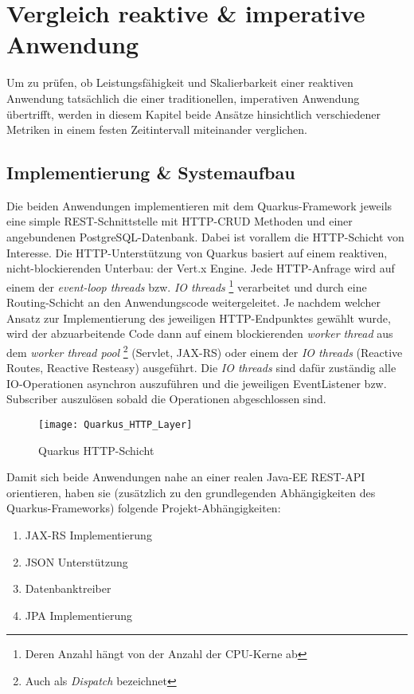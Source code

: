 \section {Vergleich reaktive \& imperative Anwendung}
\label{section:vergleich_reaktiv_imperativ}
Um zu prüfen, ob Leistungsfähigkeit und Skalierbarkeit einer reaktiven Anwendung tatsächlich die einer traditionellen, imperativen Anwendung
übertrifft, werden in diesem Kapitel beide Ansätze hinsichtlich verschiedener Metriken in einem festen Zeitintervall miteinander verglichen.

\subsection{Implementierung \& Systemaufbau}
\label{section:implementierung}
Die beiden Anwendungen implementieren mit dem Quarkus-Framework jeweils eine simple REST-Schnittstelle mit HTTP-CRUD Methoden
und einer angebundenen PostgreSQL-Datenbank.
Dabei ist vorallem die HTTP-Schicht von Interesse. Die HTTP-Unterstützung von Quarkus basiert auf einem reaktiven, nicht-blockierenden
Unterbau: der Vert.x Engine.
Jede HTTP-Anfrage wird auf einem der \textit{event-loop threads} bzw. \textit{IO threads}
\footnote{Deren Anzahl hängt von der Anzahl der CPU-Kerne ab}
verarbeitet und durch eine Routing-Schicht an den Anwendungscode weitergeleitet.
Je nachdem welcher Ansatz zur Implementierung des jeweiligen HTTP-Endpunktes gewählt wurde,
wird der abzuarbeitende Code dann auf einem blockierenden \textit{worker thread} aus dem \textit{worker thread pool}
\footnote{Auch als \textit{Dispatch} bezeichnet} (Servlet, JAX-RS) oder einem der
\textit{IO threads} (Reactive Routes, Reactive Resteasy) ausgeführt.
Die \textit{IO threads} sind dafür zuständig alle IO-Operationen asynchron auszuführen und die jeweiligen EventListener bzw. Subscriber auszulösen sobald
die Operationen abgeschlossen sind.
\newpage
\begin{figure}[h!]
    \centering
    \texttt{[image: Quarkus\_HTTP\_Layer]}
    \caption{Quarkus HTTP-Schicht \parencite{QuarkusReactiveRoutes}}
\end{figure}

Damit sich beide Anwendungen nahe an einer realen Java-EE REST-API orientieren, haben
sie (zusätzlich zu den grundlegenden Abhängigkeiten des Quarkus-Frameworks) folgende Projekt-Abhängigkeiten:
\begin{enumerate}
    \item JAX-RS Implementierung
    \item JSON Unterstützung
    \item Datenbanktreiber
    \item JPA Implementierung
\end{enumerate}

